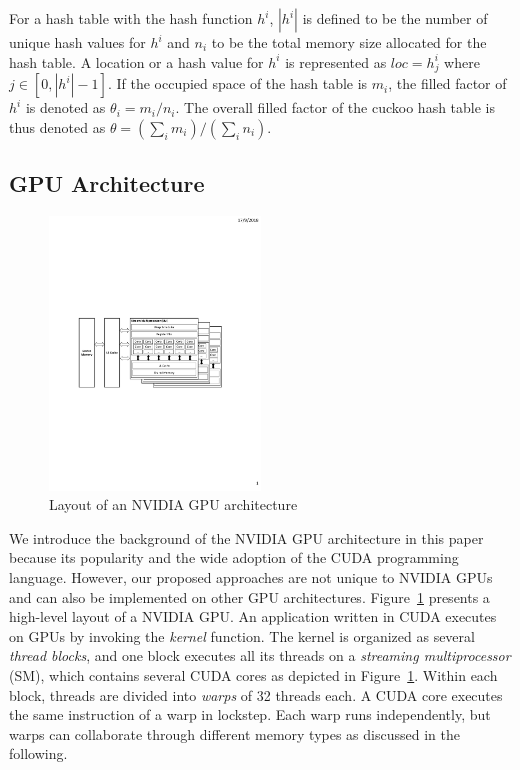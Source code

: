 For a hash table with the hash function $h^i$, $|h^i|$ is defined to be the number of unique hash values for $h^i$ and $n_i$ to be the total memory size allocated for the hash table.
A location or a hash value for $h^i$ is represented as $loc = h^i_j$ where $j \in [0,|h^i|-1]$.
If the occupied space of the hash table is $m_i$, the filled factor of $h^i$ is denoted as $\theta_i = m_i / n_i$. The overall filled factor of the cuckoo hash table is thus denoted as $\theta = (\sum_i m_i) / (\sum_i n_i)$.

\subsection{GPU Architecture}

\begin{figure}[t]
	\centering
	\includegraphics[width=0.5\textwidth]{fig/GPU-arch.pdf}
	\caption{Layout of an NVIDIA GPU architecture}
	\label{fig:arch}
\end{figure}

We introduce the background of the NVIDIA GPU architecture in this paper because its popularity and the wide adoption of the CUDA programming language. 
However, our proposed approaches are not unique to NVIDIA GPUs and can also be implemented on other GPU architectures. 
Figure~\ref{fig:arch} presents a high-level layout of a NVIDIA GPU. 
An application written in CUDA executes on GPUs by invoking the \emph{kernel} function. The kernel is organized as several \emph{thread blocks}, and one block executes all its threads on a \emph{streaming multiprocessor} (SM), which contains several CUDA cores as depicted in Figure~\ref{fig:arch}. Within each block, threads are divided into \emph{warps} of 32 threads each. 
A CUDA core executes the same instruction of a warp in lockstep.
Each warp runs independently, but warps can collaborate through different memory types as discussed in the following.  

